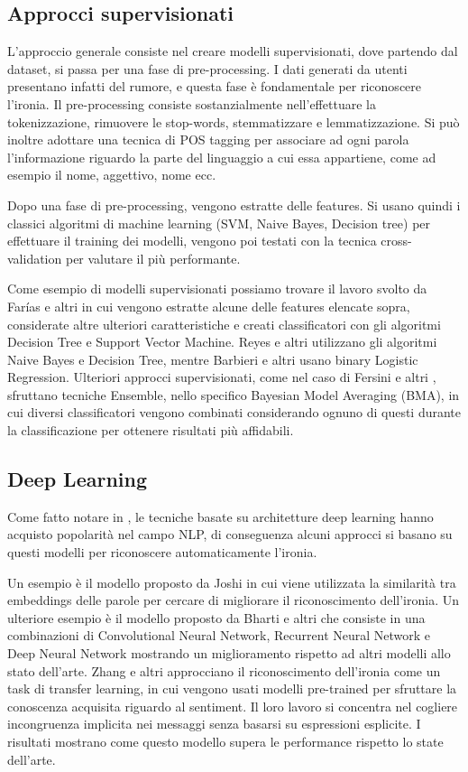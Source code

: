 \documentclass[oneside]{book}
\begin{document}
\subsection{Approcci supervisionati}
L'approccio generale consiste nel creare modelli supervisionati, dove partendo dal dataset, si passa per una fase di pre-processing. I dati generati da utenti presentano infatti del rumore, e questa fase è fondamentale per riconoscere l'ironia. Il pre-processing consiste sostanzialmente nell'effettuare la tokenizzazione, rimuovere le stop-words, stemmatizzare e lemmatizzazione. Si può inoltre adottare una tecnica di POS tagging per associare ad ogni parola l'informazione riguardo la parte del linguaggio a cui essa appartiene, come ad esempio il nome, aggettivo, nome ecc.

Dopo una fase di pre-processing, vengono estratte delle features. Si usano quindi i classici algoritmi di machine learning (SVM, Naive Bayes, Decision tree) per effettuare il training dei modelli, vengono poi testati con la tecnica cross-validation per valutare il più performante.

Come esempio di modelli supervisionati possiamo trovare il lavoro svolto da Farías e altri \cite{farias} in cui vengono estratte alcune delle features elencate sopra, considerate altre ulteriori caratteristiche e creati classificatori con gli algoritmi Decision Tree e Support Vector Machine. Reyes e altri \cite{reyes} utilizzano gli algoritmi Naive Bayes e Decision Tree, mentre Barbieri e altri \cite{sarcasm-ita} usano binary Logistic Regression.
Ulteriori approcci supervisionati, come nel caso di Fersini e altri \cite{fersini}, sfruttano tecniche Ensemble, nello specifico Bayesian Model Averaging (BMA), in cui diversi classificatori vengono combinati considerando ognuno di questi durante la classificazione per ottenere risultati più affidabili.



\subsection{Deep Learning}
Come fatto notare in \cite{survey5}, le tecniche basate su architetture deep learning hanno acquisto popolarità nel campo NLP, di conseguenza alcuni approcci si basano su questi modelli per riconoscere automaticamente l'ironia.

Un esempio è il modello proposto da Joshi \cite{embeddings} in cui viene utilizzata la similarità tra embeddings delle parole per cercare di migliorare il riconoscimento dell'ironia. Un ulteriore esempio è il modello proposto da Bharti e altri \cite{deep-learning} che consiste in una combinazioni di Convolutional Neural Network, Recurrent Neural Network e Deep Neural Network mostrando un miglioramento rispetto ad altri modelli allo stato dell'arte. Zhang e altri \cite{zang} approcciano il riconoscimento dell'ironia come un task di transfer learning, in cui vengono usati modelli pre-trained per sfruttare la conoscenza acquisita riguardo al sentiment. Il loro lavoro si concentra nel cogliere incongruenza implicita nei messaggi senza basarsi su espressioni esplicite. I risultati mostrano come questo modello supera le performance rispetto lo state dell'arte.
\end{document}
